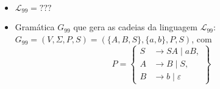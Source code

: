 \documentclass[12pt]{article}
\def\discente{Fulana(o) de tal}
\def\matricula{20010101}
\def\myling{{99}} %
\newcommand{\ve}{\ensuremath{\varepsilon}}
\begin{document}
%
\begin{tcolorbox}[rounded corners, colback=yellow!5, colframe=red!40!black, title={\discente\ (\matricula)}]
\begin{itemize}
  \item  $\mathcal{L}_{\myling} = ???$
  \item Gramática $G_{\myling}$ que gera as cadeias da linguagem $\mathcal{L}_{\myling}$:\\
  $G_{\myling}=(V,\Sigma,P,S)=(\{A,B,S\},\{a,b\},P,S)$, com
    \[P=\left\{
     \begin{aligned}
      S & \to SA\mid aB, \\
      A & \to B\mid S, \\
      B & \to b\mid \ve
     \end{aligned}
    \right\}\]
 \end{itemize}
\end{tcolorbox}\bigskip
\end{document}
